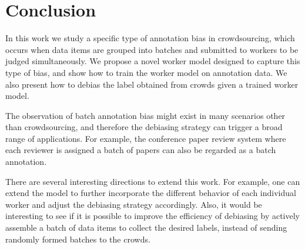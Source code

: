 \section{Conclusion}
\label{sec:conclusion}

In this work we study a specific type of annotation bias in crowdsourcing, 
which occurs when data items are grouped into batches 
and submitted to workers to be judged simultaneously.  
We propose a novel worker model designed to capture this type of bias, 
and show how to train the worker model on annotation data.  
We also present how to debias the label obtained from crowds given a trained worker model.  

The observation of batch annotation bias might exist in many scenarios other than crowdsourcing, 
and therefore the debiasing strategy can trigger a broad range of applications. 
For example, the conference paper review system where each reviewer is assigned a batch of papers 
can also be regarded as a batch annotation.  

There are several interesting directions to extend this work.  
For example, one can extend the model to further incorporate the different behavior of each individual worker  
and adjust the debiasing strategy accordingly.  
Also, it would be interesting to see if it is possible to improve the efficiency of debiasing 
by actively assemble a batch of data items to collect the desired labels, 
instead of sending randomly formed batches to the crowds.  


